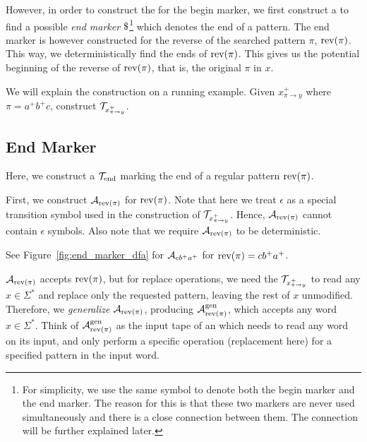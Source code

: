 However, in order to construct the \nft for the begin marker, we first construct a \dft to find a possible \emph{end marker} $\marker$\footnote{For simplicity, we use the same symbol to denote both the begin marker and the end marker. The reason for this is that these two markers are never used simultaneously and there is a close connection between them. The connection will be further explained later.} which denotes the end of a pattern.
The end marker \dft is however constructed for the reverse of the searched pattern $\pi$, $\text{rev(}\pi\text{)}$.
This way, we deterministically find the ends of $\text{rev(}\pi\text{)}$.
This gives us the potential beginning of the reverse of $\text{rev(}\pi\text{)}$, that is, the original $\pi$ in $x$.

We will explain the construction on a running example.
Given $x^{+}_{\pi \rightarrow y}$ where $\pi = a^+b^+c$, construct $\mathcal{T}_{x^{+}_{\pi \rightarrow y}}$.

\subsection{End Marker \dft}
Here, we construct a \dft $\mathcal{T}_{\text{end}}$ marking the end of a regular pattern $\text{rev(}\pi\text{)}$.

First, we construct \dfa $\mathcal{A}_{\text{rev(}\pi\text{)}}$ for $\text{rev(}\pi\text{)}$.
Note that here we treat $\epsilon$ as a special transition symbol used in the construction of $\mathcal{T}_{x^{+}_{\pi \rightarrow y}}$.
Hence, $\mathcal{A}_{\text{rev(}\pi\text{)}}$ cannot contain $\epsilon$ symbols.
Also note that we require $\mathcal{A}_{\text{rev(}\pi\text{)}}$ to be deterministic.

See Figure~\ref{fig:end_marker_dfa} for \dfa $\mathcal{A}_{cb^+a^+}$ for $\text{rev(}\pi\text{)} = cb^+a^+$.


$\mathcal{A}_{\text{rev(}\pi\text{)}}$ accepts $\text{rev(}\pi\text{)}$, but for replace operations, we need the $\mathcal{T}_{x^{+}_{\pi \rightarrow y}}$ to read any $x \in \Sigma^*$ and replace only the requested pattern, leaving the rest of $x$ unmodified.
Therefore, we \emph{generalize} $\mathcal{A}_{\text{rev(}\pi\text{)}}$, producing $\mathcal{A}^{\text{gen}}_{\text{rev(}\pi\text{)}}$, which accepts any word $x \in \Sigma^*$.
Think of $\mathcal{A}^{\text{gen}}_{\text{rev(}\pi\text{)}}$ as the input tape of an \nft which needs to read any word on its input, and only perform a specific operation (replacement here) for a specified pattern in the input word.

